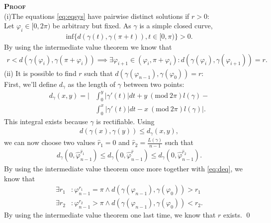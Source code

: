 \documentclass[12pt,a4paper]{scrartcl}
\newcommand{\Mod}[1]{\ (\text{mod}\ #1)}
\numberwithin{equation}{section}
\numberwithin{myalgctr}{section}
\numberwithin{mytheoremctr}{section}
\newenvironment{myproof}{%
	\bigskip\noindent%
	\textsc{\textbf{Proof}}%
	\indent
}{\qed\par\bigskip}  %
\numberwithin{myexamplectr}{subsection}
\begin{document}
	\begin{myproof} \\
		(i)The equations \eqref{eq:eqsys} have pairwise distinct solutions if $r>0$:\\
		Let $\varphi_i\in[0,2\pi)$ be arbitrary but fixed.
		As $\gamma$ is a simple closed curve, 
		\begin{align*}
			\text{inf}\{d(\gamma(t),\gamma(\pi+t)),t\in[0,\pi)\}>0.
		\end{align*}
		By using the intermediate value theorem \autocite{intermediatevalue} we know that
		\begin{align*}
			r<d(\gamma(\varphi_i),\gamma(\pi+\varphi_i)) \implies \exists\varphi_{i+1}\in(\varphi_i,\pi+\varphi_i):d(\gamma(\varphi_i),\gamma(\varphi_{i+1})) = r.
		\end{align*}
		(ii) It is possible to find $r$ such that $d(\gamma(\varphi_{n-1}),\gamma(\varphi_{0}))=r$:\\
		First, we'll define $d_\gamma$ as the length of $\gamma$ between two points:
		\begin{align*}
			d_\gamma(x,y)=\Biggl|&\int_{0}^{y}|\gamma'(t)|dt + y\Mod{2\pi}l(\gamma)-\\
							   &\int_{0}^{x}|\gamma'(t)|dt- x\Mod{2\pi}l(\gamma)\Biggr|.
		\end{align*}
		This integral exists because $\gamma$ is rectifiable. Using 
		\begin{align}
			d(\gamma(x),\gamma(y))\leq d_\gamma(x,y),\label{eq:deq}
		\end{align}
		we can now choose two values $\hat{r}_1=0$ and $\hat{r}_2=\frac{L(\gamma)}{n-1}$ such that
		\begin{align*}
			d_\gamma(0,\hat{\varphi}_{n-1}^{\hat{r}_1})\leq d_\gamma(0,\hat{\varphi}_{n-1}^{\hat{r}})\leq d_\gamma(0,\hat{\varphi}_{n-1}^{\hat{r}_2}).
		\end{align*}
		By using the intermediate value theorem once more together with \cref{eq:deq}, we know that 
		\begin{align*}
			\exists r_1&:\varphi^{r_1}_{n-1}=\pi\land d(\gamma(\varphi_{n-1}),\gamma(\varphi_0))>r_1\\
			\exists r_2&:\varphi^{r_2}_{n-1}>\pi\land d(\gamma(\varphi_{n-1}),\gamma(\varphi_0))<r_2.
		\end{align*}
		By using the intermediate value theorem one last time, we know that $r$ exists.
	\end{myproof}
	
	\newpage
\end{document}
